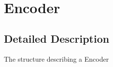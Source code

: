 \hypertarget{group__encoder}{}\section{Encoder}
\label{group__encoder}


\subsection{Detailed Description}
The structure describing a Encoder 